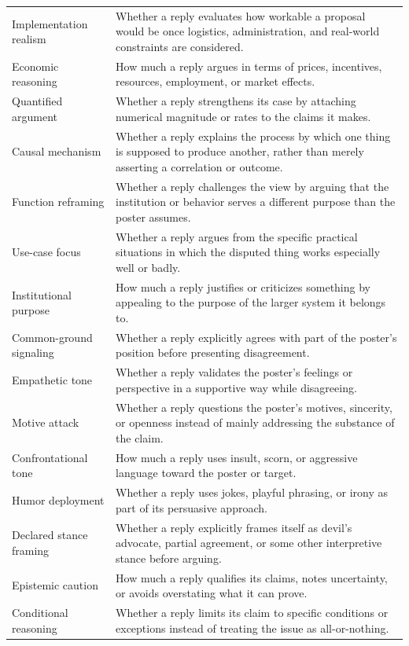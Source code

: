 \begin{tabularx}{\textwidth}{@{}>{\raggedright\arraybackslash}p{} X@{}}
Implementation realism & Whether a reply evaluates how workable a proposal would be once logistics, administration, and real-world constraints are considered. \\
Economic reasoning & How much a reply argues in terms of prices, incentives, resources, employment, or market effects. \\
Quantified argument & Whether a reply strengthens its case by attaching numerical magnitude or rates to the claims it makes. \\
Causal mechanism & Whether a reply explains the process by which one thing is supposed to produce another, rather than merely asserting a correlation or outcome. \\
Function reframing & Whether a reply challenges the view by arguing that the institution or behavior serves a different purpose than the poster assumes. \\
Use-case focus & Whether a reply argues from the specific practical situations in which the disputed thing works especially well or badly. \\
Institutional purpose & How much a reply justifies or criticizes something by appealing to the purpose of the larger system it belongs to. \\
Common-ground signaling & Whether a reply explicitly agrees with part of the poster's position before presenting disagreement. \\
Empathetic tone & Whether a reply validates the poster's feelings or perspective in a supportive way while disagreeing. \\
Motive attack & Whether a reply questions the poster's motives, sincerity, or openness instead of mainly addressing the substance of the claim. \\
Confrontational tone & How much a reply uses insult, scorn, or aggressive language toward the poster or target. \\
Humor deployment & Whether a reply uses jokes, playful phrasing, or irony as part of its persuasive approach. \\
Declared stance framing & Whether a reply explicitly frames itself as devil's advocate, partial agreement, or some other interpretive stance before arguing. \\
Epistemic caution & How much a reply qualifies its claims, notes uncertainty, or avoids overstating what it can prove. \\
Conditional reasoning & Whether a reply limits its claim to specific conditions or exceptions instead of treating the issue as all-or-nothing. \\

\end{tabularx}
